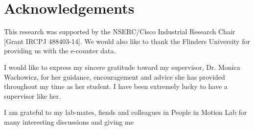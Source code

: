 \chapter*{Acknowledgements}

This research was supported by the NSERC/Cisco Industrial Research Chair [Grant IRCPJ 488403-14]. We would also like to thank the Flinders University for providing us with the e-counter data.

I would like to express my sincere gratitude toward my supervisor, Dr. Monica Wachowicz, for her guidance, encouragement and advice she has provided throughout my time as her student. I have been extremely lucky to have a supervisor like her.


I am  grateful to my lab-mates, fiends and colleagues in People in Motion Lab for many interesting discussions and giving me 